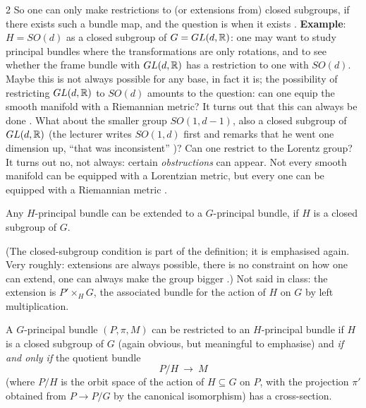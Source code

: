 \begin{paracol}{2}
So one can only make restrictions to (or extensions from) closed subgroups, if there exists such a bundle map, and the question is when it exists . \textbf{Example}: $H=SO(d)$ as a closed subgroup of $G=GL(d,\mathbb{R})$: one may want to study principal bundles where the transformations are only rotations, and to see whether the frame bundle with $GL(d,\mathbb{R})$ has a restriction to one with $SO(d)$. Maybe this is not always possible for any base, in fact it is; the possibility of restricting $GL(d,\mathbb{R})$ to $SO(d)$ amounts to the question: can one equip the smooth manifold with a Riemannian metric? It turns out that this can always be done     . What about the smaller group $SO(1,d-1)$, also a closed subgroup of $GL(d,\mathbb{R})$ (the lecturer writes $SO(1,d)$ first and remarks that he went one dimension up, ``that was inconsistent'' )? Can one restrict to the Lorentz group? It turns out no, not always: certain \emph{obstructions} can appear. Not every smooth manifold can be equipped with a Lorentzian metric, but every one can be equipped with a Riemannian metric   .
\begin{theorem}[Extension]\label{thm:ab-extension}
Any $H$-principal bundle can be extended to a $G$-principal bundle, if $H$ is a closed subgroup of $G$.    
\end{theorem}
(The closed-subgroup condition is part of the definition; it is emphasised again. Very roughly: extensions are always possible, there is no constraint on how one can extend, one can always make the group bigger .) Not said in class: the extension is $P'\times_HG$, the associated bundle for the action of $H$ on $G$ by left multiplication.
\begin{theorem}[Restriction]\label{thm:ab-restriction}
A $G$-principal bundle $(P,\pi,M)$ can be restricted to an $H$-principal bundle if $H$ is a closed subgroup of $G$ (again obvious, but meaningful to emphasise) and \emph{if and only if} the quotient bundle
\[
  P/H\ \longrightarrow\ M
\]
(where $P/H$ is the orbit space of the action of $H\subseteq G$ on $P$, with the projection $\pi'$ obtained from $P\to P/G$ by the canonical isomorphism) has a cross-section.       
\end{theorem}

\end{paracol}
